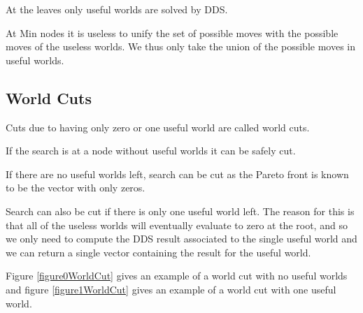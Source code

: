 \documentclass[letterpaper]{article} %
\begin{document}
At the leaves only useful worlds are solved by DDS.

At Min nodes it is useless to unify the set of possible moves with the possible moves of the useless worlds. We thus only take the union of the possible moves in useful worlds.



\subsection{World Cuts}

Cuts due to having only zero or one useful world are called world cuts.

If the search is at a node without useful worlds it can be safely cut. 

If there are no useful worlds left, search can be cut as the Pareto front is known to be the vector with only zeros.

Search can also be cut if there is only one useful world left. The reason for this is that all of the useless worlds will eventually evaluate to zero at the root, and so we only need to compute the DDS result associated to the single useful world and we can return a single vector containing the result for the useful world.

Figure \ref{figure0WorldCut} gives an example of a world cut with no useful worlds and figure \ref{figure1WorldCut} gives an example of a world cut with one useful world.
\end{document}
